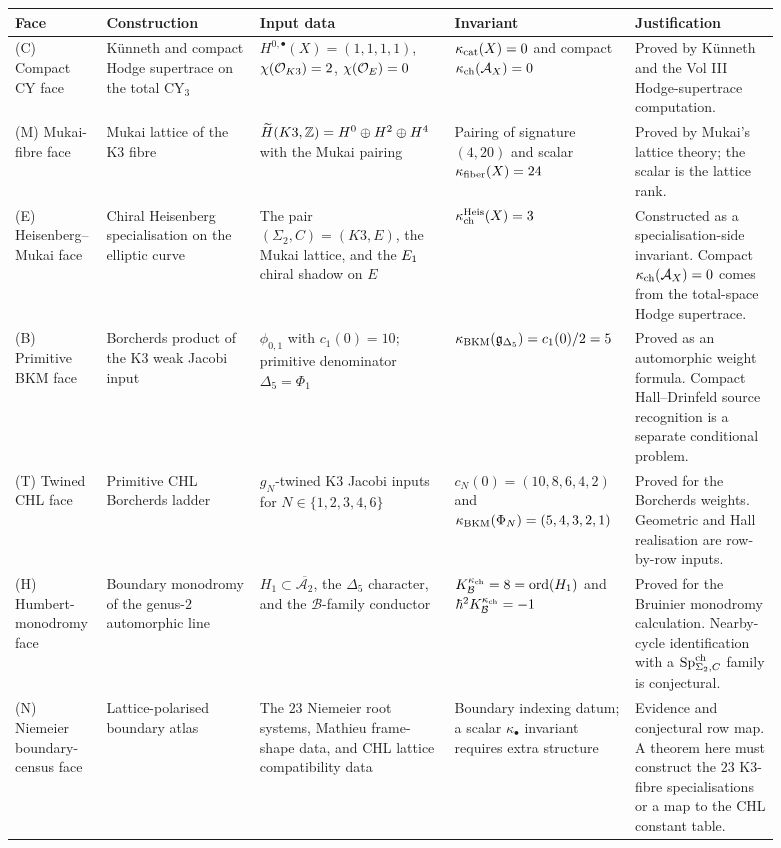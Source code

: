 \begin{center}
\small
\renewcommand{\arraystretch}{1.3}
\begin{tabular}{|p{0.09\linewidth}|p{0.19\linewidth}|p{0.24\linewidth}|p{0.19\linewidth}|p{0.18\linewidth}|}
\hline
Face & Construction & Input data & Invariant & Justification \\
\hline
(C) Compact CY face &
K\"unneth and compact Hodge supertrace on the total CY$_3$ &
$H^{0,\bullet}(X)=(1,1,1,1)$,
$\chi(\mathcal{O}_{K3})=2$, $\chi(\mathcal{O}_E)=0$ &
$\kappa_{\mathrm{cat}}(X)=0$ and compact $\kappa_{\mathrm{ch}}(\mathcal{A}_X)=0$ &
Proved by K\"unneth and the Vol III Hodge-supertrace computation. \\
\hline
(M) Mukai-fibre face &
Mukai lattice of the K3 fibre &
$\widetilde H(K3,\mathbb{Z})=H^0\oplus H^2\oplus H^4$ with the Mukai pairing &
Pairing of signature $(4,20)$ and scalar $\kappa_{\mathrm{fiber}}(X)=24$ &
Proved by Mukai's lattice theory; the scalar is the lattice rank. \\
\hline
(E) Heisenberg--Mukai face &
Chiral Heisenberg specialisation on the elliptic curve &
The pair $(\Sigma_2,C)=(K3,E)$, the Mukai lattice, and the $E_1$
chiral shadow on $E$ &
$\kappa_{\mathrm{ch}}^{\mathrm{Heis}}(X)=3$ &
Constructed as a specialisation-side invariant.  Compact
$\kappa_{\mathrm{ch}}(\mathcal{A}_X)=0$ comes from the total-space Hodge supertrace. \\
\hline
(B) Primitive BKM face &
Borcherds product of the K3 weak Jacobi input &
$\phi_{0,1}$ with $c_1(0)=10$; primitive denominator
$\Delta_5=\Phi_1$ &
$\kappa_{\mathrm{BKM}}(\mathfrak g_{\Delta_5})=c_1(0)/2=5$ &
Proved as an automorphic weight formula.  Compact Hall--Drinfeld source
recognition is a separate conditional problem. \\
\hline
(T) Twined CHL face &
Primitive CHL Borcherds ladder &
$g_N$-twined K3 Jacobi inputs for
$N\in\{1,2,3,4,6\}$ &
$c_N(0)=(10,8,6,4,2)$ and
$\kappa_{\mathrm{BKM}}(\Phi_N)=(5,4,3,2,1)$ &
Proved for the Borcherds weights.  Geometric and Hall realisation are
row-by-row inputs. \\
\hline
(H) Humbert-monodromy face &
Boundary monodromy of the genus-$2$ automorphic line &
$H_1\subset\overline{\mathcal A_2}$, the $\Delta_5$ character, and the
$\mathcal B$-family conductor &
$K_{\mathcal B}^{\kappa_{\mathrm{ch}}}=8=\mathrm{ord}(H_1)$ and
$\hbar^2K_{\mathcal B}^{\kappa_{\mathrm{ch}}}=-1$ &
Proved for the Bruinier monodromy calculation.  Nearby-cycle
identification with a $\mathrm{Sp}^{\mathrm{ch}}_{\Sigma_2,C}$ family is conjectural. \\
\hline
(N) Niemeier boundary-census face &
Lattice-polarised boundary atlas &
The $23$ Niemeier root systems, Mathieu frame-shape data, and CHL
lattice compatibility data &
Boundary indexing datum; a scalar $\kappa_\bullet$ invariant requires
extra structure &
Evidence and conjectural row map.  A theorem here must construct the
$23$ K3-fibre specialisations or a map to the CHL constant table. \\
\hline
\end{tabular}
\end{center}

